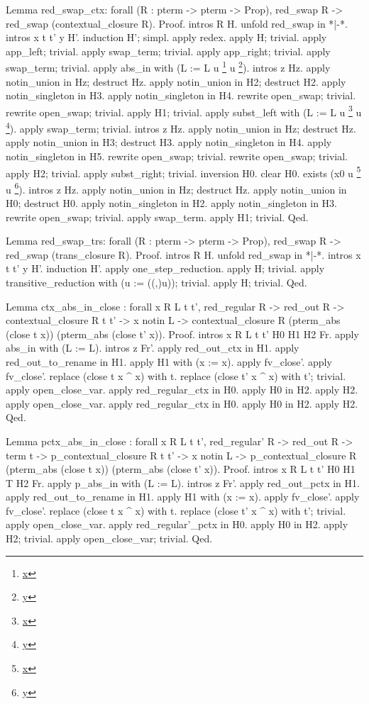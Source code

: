 \documentclass[12pt]{report}
\begin{document}
Lemma red\_swap\_ctx: forall (R : pterm -> pterm -> Prop),
  red\_swap R -> red\_swap (contextual\_closure R).
Proof.
 intros R H. unfold red\_swap in *|-*.
 intros x t t' y H'. induction H'; simpl.
 apply redex. apply H; trivial.
 apply app\_left; trivial. apply swap\_term; trivial.
 apply app\_right; trivial. apply swap\_term; trivial.
 apply abs\_in with (L := L u \footnote{\url{x}} u \footnote{\url{y}}). intros z Hz.
 apply notin\_union in Hz; destruct Hz.
 apply notin\_union in H2; destruct H2.
 apply notin\_singleton in H3. apply notin\_singleton in H4.
 rewrite open\_swap; trivial. rewrite open\_swap; trivial.
 apply H1; trivial.
 apply subst\_left with (L := L u \footnote{\url{x}} u \footnote{\url{y}}). apply swap\_term; trivial.
 intros z Hz.
 apply notin\_union in Hz; destruct Hz.
 apply notin\_union in H3; destruct H3.
 apply notin\_singleton in H4. apply notin\_singleton in H5.
 rewrite open\_swap; trivial. rewrite open\_swap; trivial.
 apply H2; trivial.
 apply subst\_right; trivial. 
 inversion H0. clear H0. exists (x0 u \footnote{\url{x}} u \footnote{\url{y}}). intros z Hz.
 apply notin\_union in Hz; destruct Hz.
 apply notin\_union in H0; destruct H0.
 apply notin\_singleton in H2. apply notin\_singleton in H3.
 rewrite open\_swap; trivial. apply swap\_term. apply H1; trivial.
Qed.


Lemma red\_swap\_trs: forall (R : pterm -> pterm -> Prop),
  red\_swap R -> red\_swap (trans\_closure R).
Proof.
 intros R H. unfold red\_swap in *|-*. intros x t t' y H'.
 induction H'. apply one\_step\_reduction. apply H; trivial.
 apply transitive\_reduction with (u := ((,)u)); trivial.
 apply H; trivial.
Qed.


Lemma ctx\_abs\_in\_close : forall x R L t t', red\_regular R -> red\_out R ->
                        contextual\_closure R t t' -> x notin L ->
                        contextual\_closure R (pterm\_abs (close t x)) (pterm\_abs (close t' x)).
Proof.
 intros x R L t t' H0 H1 H2 Fr.
 apply abs\_in with (L := L). intros z Fr'. 
 apply red\_out\_ctx in H1. apply red\_out\_to\_rename in H1.
 apply H1 with (x := x). apply fv\_close'. apply fv\_close'.
 replace (close t x \^{} x) with t. replace (close t' x \^{} x) with t'; trivial.
 apply open\_close\_var. apply red\_regular\_ctx in H0. apply H0 in H2. apply H2.
 apply open\_close\_var. apply red\_regular\_ctx in H0. apply H0 in H2. apply H2.
Qed.


Lemma pctx\_abs\_in\_close : forall x R L t t', red\_regular' R -> red\_out R -> term t ->
                         p\_contextual\_closure R t t' -> x notin L ->
                         p\_contextual\_closure R (pterm\_abs (close t x)) (pterm\_abs (close t' x)).
Proof.
 intros x R L t t' H0 H1 T H2 Fr.
 apply p\_abs\_in with (L := L). intros z Fr'. 
 apply red\_out\_pctx in H1. apply red\_out\_to\_rename in H1.
 apply H1 with (x := x). apply fv\_close'. apply fv\_close'.
 replace (close t x \^{} x) with t. replace (close t' x \^{} x) with t'; trivial.
 apply open\_close\_var. apply red\_regular'\_pctx in H0. apply H0 in H2. apply H2; trivial.
 apply open\_close\_var; trivial. 
Qed.
\end{document}
